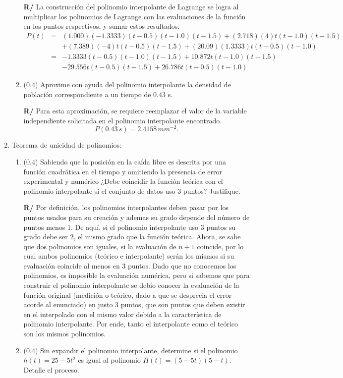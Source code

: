 \documentclass[12pt]{article}
\begin{document}
\begin{enumerate}[leftmargin=*,widest=9]
\begin{enumerate}[label=\alph*]
\textbf{R/} La construcción del polinomio interpolante de Lagrange se logra al multiplicar los polinomios de Lagrange con las evaluaciones de la función en los puntos respectivos, y sumar estos resultados.
    \begin{eqnarray*}
    P(t)& = & (1.000)(-1.3333)(t-0.5)(t-1.0)(t-1.5)+(2.718)(4)t(t-1.0)(t-1.5) \\
    && +(7.389)(-4)t(t-0.5)(t-1.5)+(20.09)(1.3333)t(t-0.5)(t-1.0) \\
    & = & -1.3333(t-0.5)(t-1.0)(t-1.5) + 10.872t(t-1.0)(t-1.5) \\
    && - 29.556t(t-0.5)(t-1.5) + 26.786t(t-0.5)(t-1.0)
    \end{eqnarray*}
    \item (\(0.4\)) Aproxime con ayuda del polinomio interpolante la densidad de población correspondiente a un tiempo de \(0.43\) s.

\textbf{R/} Para esta aproximación, se requiere reemplazar el valor de la variable independiente solicitada en el polinomio interpolante encontrado. \[ P(0.43\,s) = 2.4158\,mm^{-2}.\]
    \end{enumerate}
    \item Teorema de unicidad de polinomios:
    \begin{enumerate}[label=\alph*]
    \item (\(0.4\)) Sabiendo que la posición en la caída libre es descrita por una función cuadrática en el tiempo y omitiendo la presencia de error experimental y numérico ¿Debe coincidir la función teórica con el polinomio interpolante si el conjunto de datos uso 3 puntos? Justifique.

\textbf{R/} Por definición, los polinomios interpolantes deben pasar por los puntos usados para su creación y ademas su grado depende del número de puntos menos \(1\). De aquí, si el polinomio interpolante uso 3 puntos su grado debe ser \(2\), el mismo grado que la función teórica. Ahora, se sabe que dos polinomios son iguales, si la evaluación de \(n+1\) coincide, por lo cual ambos polinomios (teórico e interpolante) serán los mismos si su evaluación coincide al menos en 3 puntos. Dado que no conocemos los polinomios, es imposible la evaluación numérica, pero si sabemos que para construir el polinomio interpolante se debio conocer la evaluación de la función original (medición o teórico, dado a que se desprecia el error acorde al enunciado) en justo 3 puntos, que son puntos que deben existir en el interpolado con el mismo valor debido a la característica de polinomio interpolante. Por ende, tanto el interpolante como el teórico son los mismos polinomios.
    \item (\(0.4\)) Sin expandir el polinomio interpolante, determine si el polinomio \(h(t) = 25 - 5 t^2\) es igual al polinomio \(H(t) = (5 - 5t)(5 - t)\). Detalle el proceso.


\end{enumerate}
\end{enumerate}
\end{document}

